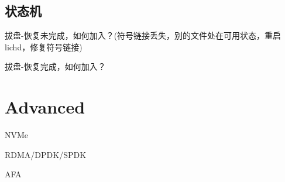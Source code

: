 \subsection{状态机}

拔盘-恢复未完成，如何加入？(符号链接丢失，别的文件处在可用状态，重启lichd，修复符号链接)

拔盘-恢复完成，如何加入？

\section{Advanced}

NVMe

RDMA/DPDK/SPDK

AFA
